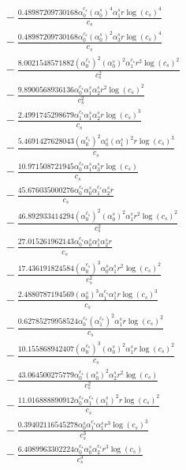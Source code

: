 \documentclass[10pt]{article}
\begin{document}
\begin{align*}
&{}  - \frac{0.48987209730168 \alpha_{0}^{c_s} \left(\alpha_{0}^s\right)^{4} \alpha_{1}^s r \log{\left(c_{s} \right)}^{4}}{c_{s}} \\
&{}  - \frac{0.48987209730168 \alpha_{0}^{c_s} \left(\alpha_{0}^s\right)^{2} \alpha_{3}^s r \log{\left(c_{s} \right)}^{4}}{c_{s}} \\
&{}  - \frac{8.0021548571882 \left(\alpha_{0}^{c_s}\right)^{2} \left(\alpha_{0}^s\right)^{2} \alpha_{1}^{c_s} r^{2} \log{\left(c_{s} \right)}^{2}}{c_{s}^{2}} \\
&{}  - \frac{9.8900568936136 \alpha_{0}^{c_s} \alpha_{1}^s \alpha_{2}^s r^{2} \log{\left(c_{s} \right)}^{2}}{c_{s}^{2}} \\
&{}  - \frac{2.4991745298679 \alpha_{1}^{c_s} \alpha_{1}^s \alpha_{2}^s r \log{\left(c_{s} \right)}^{3}}{c_{s}} \\
&{}  - \frac{5.4691427628043 \left(\alpha_{0}^{c_s}\right)^{2} \alpha_{0}^s \left(\alpha_{1}^s\right)^{2} r \log{\left(c_{s} \right)}^{3}}{c_{s}} \\
&{}  - \frac{10.971508721945 \alpha_{0}^{c_s} \alpha_{1}^s \alpha_{3}^s r \log{\left(c_{s} \right)}}{c_{s}} \\
&{}  - \frac{45.676035000276 \alpha_{0}^{c_s} \alpha_{0}^s \alpha_{1}^{c_s} \alpha_{2}^s r}{c_{s}} \\
&{}  - \frac{46.892933414294 \left(\alpha_{0}^{c_s}\right)^{2} \left(\alpha_{0}^s\right)^{2} \alpha_{1}^s r^{2} \log{\left(c_{s} \right)}^{2}}{c_{s}^{2}} \\
&{}  - \frac{27.015261962143 \alpha_{0}^{c_s} \alpha_{0}^s \alpha_{1}^s \alpha_{2}^s r}{c_{s}} \\
&{}  - \frac{17.436191824584 \left(\alpha_{0}^{c_s}\right)^{3} \alpha_{0}^s \alpha_{1}^s r^{2} \log{\left(c_{s} \right)}^{2}}{c_{s}^{2}} \\
&{}  - \frac{2.4880787194569 \left(\alpha_{0}^s\right)^{3} \alpha_{1}^{c_s} \alpha_{1}^s r \log{\left(c_{s} \right)}^{3}}{c_{s}} \\
&{}  - \frac{0.62785279958524 \alpha_{0}^{c_s} \left(\alpha_{1}^{c_s}\right)^{2} \alpha_{1}^s r \log{\left(c_{s} \right)}^{2}}{c_{s}} \\
&{}  - \frac{10.155868942407 \left(\alpha_{0}^{c_s}\right)^{3} \left(\alpha_{0}^s\right)^{2} \alpha_{1}^s r \log{\left(c_{s} \right)}^{2}}{c_{s}} \\
&{}  - \frac{43.064500275779 \alpha_{0}^{c_s} \left(\alpha_{0}^s\right)^{2} \alpha_{2}^s r^{2} \log{\left(c_{s} \right)}}{c_{s}^{2}} \\
&{}  - \frac{11.016888890912 \alpha_{0}^{c_s} \alpha_{1}^{c_s} \left(\alpha_{1}^s\right)^{2} r \log{\left(c_{s} \right)}^{2}}{c_{s}} \\
&{}  - \frac{0.39402116545278 \alpha_{0}^s \alpha_{1}^{c_s} \alpha_{1}^s r^{3} \log{\left(c_{s} \right)}^{3}}{c_{s}^{3}} \\
&{}  - \frac{6.4089963302224 \alpha_{0}^{c_s} \alpha_{0}^s \alpha_{2}^{c_s} r^{3} \log{\left(c_{s} \right)}}{c_{s}^{3}}
\end{align*}
\end{document}
